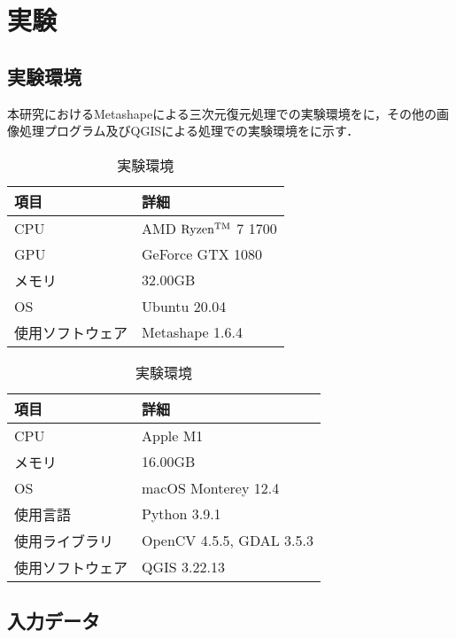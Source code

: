 \chapter{実験}
  \section{実験環境}
    本研究におけるMetashapeによる三次元復元処理での実験環境をに，その他の画像処理プログラム及びQGISによる処理での実験環境をに示す．

    \begin{table}[tbp]
      \centering
      \caption{実験環境}
      \label{実験環境1}
      \begin{tabular}{ll}
        \hline
        \textbf{項目} & \textbf{詳細} \\
        \hline \hline
        CPU & AMD $\rm{Ryzen^{TM}}$ 7 1700 \\
        GPU & GeForce GTX 1080 \\
        メモリ & 32.00GB \\
        OS & Ubuntu 20.04 \\
        使用ソフトウェア & Metashape 1.6.4 \\ \hline 
      \end{tabular}
    \end{table}

    \begin{table}[tbp]
      \centering
      \caption{実験環境}
      \label{実験環境2}
      \begin{tabular}{ll}
        \hline
        \textbf{項目} & \textbf{詳細} \\
        \hline \hline
        CPU & Apple M1 \\
        メモリ & 16.00GB \\
        OS & macOS Monterey 12.4 \\
        使用言語 & Python 3.9.1 \\
        使用ライブラリ & OpenCV 4.5.5, GDAL 3.5.3 \\ 
        使用ソフトウェア & QGIS 3.22.13 \\ \hline 
      \end{tabular}
    \end{table}



  \section{入力データ}
    \label{入力データ（実験）}
